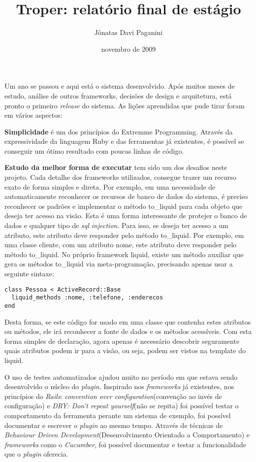 \documentclass[espaco=simples,appendix=Name]{abnt}
\title{Troper: relatório final de estágio}
\author{Jônatas Davi Paganini}
\date{novembro de 2009}
\begin{document}
\maketitle

 Um ano se passou e aqui está o sistema desenvolvido. Após muitos meses de estudo, análise de outros frameworks, decisões de design e arquitetura, está pronto o primeiro \textit{release} do sistema. As lições aprendidas que pude tirar foram em vários aspectos:

\textbf{Simplicidade} é um dos princípios do Extremme Programming. Através da expressividade da linguagem Ruby e das ferramentas já existentes, é possível se conseguir um ótimo resultado com poucas linhas de código.

\textbf{Estudo da melhor forma de executar} tem sido um dos desafios neste projeto. Cada detalhe dos frameworks utilizados, consegue trazer um recurso exato de forma simples e direta. Por exemplo, em uma necessidade de automaticamente reconhecer os recursos de banco de dados do sistema, é preciso reconhecer os padrões e implementar o método to\_liquid para cada objeto que deseja ter acesso na visão. Esta é uma forma interessante de protejer o banco de dados e qualquer tipo de \textit{sql injection}. Para isso, se deseja ter acesso a um atributo, este atributo deve responder pelo método to\_liquid. Por exemplo, em uma classe cliente, com um atributo nome, este atributo deve responder pelo método to\_liquid. No próprio framework liquid, existe um método auxiliar que gera os métodos to\_liquid via meta-programação, precisando apenas usar a seguinte sintaxe: 

\begin{lstlisting}[caption=Implementação do método to\_liquid através de um método helper]
class Pessoa < ActiveRecord::Base
  liquid_methods :nome, :telefone, :enderecos
end
\end{lstlisting}

Desta forma, se este código for usado em uma classe que contenha estes atributos ou métodos, ele irá reconhecer a fonte de dados e os métodos acessíveis. Com esta forma simples de declaração, agora apenas é necessário descobrir seguramente quais atributos podem ir para a visão, ou seja, podem ser vistos na template do liquid. 

O uso de testes automatizados ajudou muito no período em que estava sendo desenvolvido o núcleo do \textit{plugin}. Inspirado nos \textit{frameworks} já existentes, nos princípios do \textit{Rails}: \textit{convention over configuration}(convenção ao invés de configuração) e \textit{DRY: Don't repeat yourself}(não se repita) foi possível testar o comportamento da ferramenta perante um sistema de exemplo, foi possível documentar e escrever o \textit{plugin} ao mesmo tempo. Através de técnicas de \textit{Behaviour Driven Development}(Desenvolvimento Orientado a Comportamento) e \textit{frameworks} como o \textit{Cucumber}, foi possível documentar e testar a funcionalidade que o \textit{plugin} oferecia. 
\end{document}
